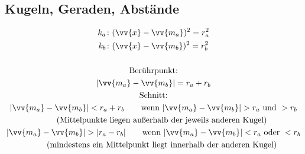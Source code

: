 \subsection{Kugeln, Geraden, Abstände}
\begin{gather*}
  k_a \colon (\vv{x} - \vv{m_a})^2 = r_a^2 \\
  k_b \colon (\vv{x} - \vv{m_b})^2 = r_b^2 \\\\
  \text{Berührpunkt:} \\
  |\vv{m_a} - \vv{m_b}| = r_a + r_b \\
  \text{Schnitt:} \\
  |\vv{m_a} - \vv{m_b}| < r_a + r_b \qquad \text{wenn } |\vv{m_a} - \vv{m_b}| > r_a \text{ und } > r_b \\
  \qquad \text{(Mittelpunkte liegen außerhalb der jeweils anderen Kugel)} \\
  |\vv{m_a} - \vv{m_b}| > |r_a - r_b| \qquad \text{wenn } |\vv{m_a} - \vv{m_b}| < r_a \text{ oder } < r_b \\
  \qquad \text{(mindestens ein Mittelpunkt liegt innerhalb der anderen Kugel)}
\end{gather*}
